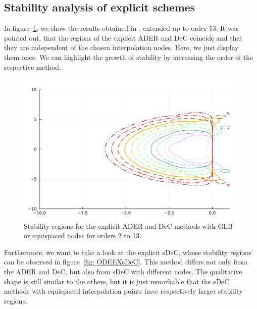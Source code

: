 \subsection{Stability analysis of explicit schemes}\label{sec:stability_explicit}
In figure~\ref{fig: ODEEXADERDeCeq}, we show the results obtained in \cite{Han_Veiga_2021}, extended up to order 13. It was pointed out, that the regions of the explicit ADER and DeC coincide and that they are independent of the chosen interpolation nodes. Here, we just display them once. We can highlight the growth of stability by increasing the order of the respective method. 
\begin{figure}[!h]
	\centering
	\begin{minipage}[t]{0.45\textwidth}
		\includegraphics[width=\textwidth,trim={0 0 0 22}, clip]{pdf/odepics/DeC_GLB_ord13.pdf}
	\end{minipage}
	\caption{Stability regions for the explicit ADER and DeC methods with GLB or equispaced nodes for orders 2 to 13.}
	\label{fig: ODEEXADERDeCeq}
\end{figure}

Furthermore, we want to take a look at the explicit sDeC, whose stability regions can be observed in figure~\ref{fig: ODEEXsDeC}. 
This method differs not only from the ADER and DeC, but also from sDeC with different nodes. The qualitative shape is still similar to the others, but it is just remarkable that the sDeC methods with equispaced interpolation points have respectively larger stability regions.


